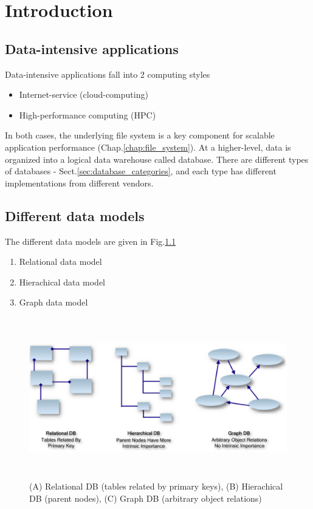 \chapter{Introduction}
\label{chap:Introduction}

\section{Data-intensive applications}

Data-intensive applications fall into 2 computing styles
\begin{itemize}
  \item Internet-service (cloud-computing)
  \item High-performance computing (HPC)
\end{itemize}
In both cases, the underlying file system is a key component for scalable
application performance (Chap.\ref{chap:file_system}). At a higher-level, data is organized into a logical data warehouse called database.
There are different types of databases - Sect.\ref{sec:database_categories}, and each type has different implementations from different vendors.

\section{Different data models}

The different data models are given in Fig.\ref{fig:data_models}
\begin{enumerate}
  \item Relational data model
  
  \item Hierachical data model
  
  \item Graph data model
\end{enumerate}

\begin{figure}[hbt]
  \centerline{\includegraphics[height=7cm,
    angle=0]{./images/data_models.eps}}
  \caption{(A) Relational DB (tables related by primary keys), (B) Hierachical DB (parent nodes), (C) Graph DB (arbitrary object relations)}
  \label{fig:data_models} 
\end{figure}


